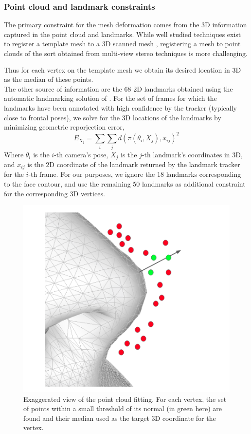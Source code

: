 \documentclass[10pt,twocolumn,letterpaper]{article}
\begin{document}
 \subsubsection{Point cloud and landmark constraints}
 The primary constraint for the mesh deformation comes from the 3D information captured in the point cloud and landmarks.
 While well studied techniques exist to register a template mesh to a 3D scanned mesh \cite{amberg2007optimal}, registering a mesh to point clouds of the sort obtained from multi-view stereo techniques is more challenging. 
 
 Thus for each vertex on the template mesh we obtain its desired location in 3D as the median of these points. \\
 
 The other source of information are the 68 2D landmarks obtained using the automatic landmarking solution of \cite{baltrusaitis2018openface}. For the set of frames for which the landmarks have been annotated with high confidence by the tracker (typically close to frontal poses), we solve for the 3D locations of the landmarks by minimizing geometric reporjection error, 
 \begin{equation}
    E_{X_{j}} = \sum_{i} \sum_{j} d(\pi (\theta_{i},X_{j}),x_{ij})^2
\end{equation}
Where $\theta_i$ is the $i$-th camera's pose, $X_{j}$ is the $j$-th landmark's coordinates in 3D, and $x_{ij}$ is the 2D coordinate of the landmark returned by the landmark tracker for the $i$-th frame. For our purposes, we ignore the 18 landmarks corresponding to the face contour, and use the remaining 50 landmarks as additional constraint for the corresponding 3D vertices. 


 \begin{figure}[t]
\begin{center}
   \includegraphics[width=0.8\linewidth]{images/mesh_fit_pcl.png}
\end{center}
   \caption{Exaggerated view of the point cloud fitting. For each vertex, the set of points within a small threshold of its normal (in green here) are found and their median used as the target 3D coordinate for the vertex. }
\label{fig:mesh_fit_pcl}
\end{figure}
\end{document}
